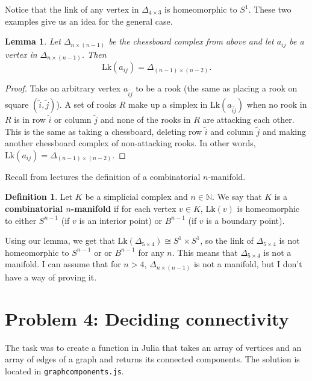 \documentclass[11pt,a4paper]{article}
\theoremstyle{plain}
\newtheorem{lemma}[theorem]{Lemma}
\theoremstyle{definition}
\newtheorem{definition}[theorem]{Definition}
\theoremstyle{remark}
\newcommand{\N}{\mathbb{N}}
\begin{document}
\noindent
Notice that the link of any vertex in $\Delta_{4\times 3}$ is homeomorphic to $S^1$. These two examples give us an idea for the general case.

\begin{lemma}
    Let $\Delta_{n \times (n-1)}$ be the chessboard complex from above and let $a_{ij}$ be a vertex in $\Delta_{n \times (n-1)}$.
    Then
    $$\mathrm{Lk}(a_{ij}) = \Delta_{(n-1) \times (n-2)}.$$
\end{lemma}

\begin{proof}
    Take an arbitrary vertex $a_{\tilde{i} \tilde{j}}$ to be a rook (the same as placing a rook on square $(\tilde{i},\tilde{j})$). 
    A set of rooks $R$ make up a simplex in $\text{Lk}(a_{\tilde{i}\tilde{j}})$ when no rook in $R$ is in row $\tilde{i}$ or column $\tilde{j}$
    and none of the rooks in $R$ are attacking each other. This is the same as taking a chessboard, deleting row $\tilde{i}$ and column $\tilde{j}$
    and making another chessboard complex of non-attacking rooks. In other words, $\mathrm{Lk}(a_{ij}) = \Delta_{(n-1) \times (n-2)}$.
\end{proof}


\noindent
Recall from lectures the definition of a combinatorial $n$-manifold.

\begin{definition}
    Let $K$ be a simplicial complex and $n \in \N$. We say that $K$ is a \textbf{combinatorial $n$-manifold} if for each 
    vertex $v \in K$, $\mathrm{Lk}(v)$ is homeomorphic to either $S^{n-1}$ (if $v$ is an interior point) or $B^{n-1}$ (if $v$ is a boundary point).
\end{definition}


\noindent
Using our lemma, we get that $\mathrm{Lk}(\Delta_{5 \times 4}) \cong S^1 \times S^1$, so the link of $\Delta_{5 \times 4}$ is not homeomorphic
to $S^{n-1}$ or or $B^{n-1}$ for any $n$. This means that $\Delta_{5 \times 4}$ is not a manifold. I can assume that for $n > 4$, $\Delta_{n \times (n-1)}$ is not a manifold, but I don't have a way of proving it.

\section{Problem 4: Deciding connectivity}

The task was to create a function in Julia that takes an array of vertices and an array of edges of a graph and returns its connected
components. The solution is located in \texttt{graphcomponents.js}. \\
\end{document}
